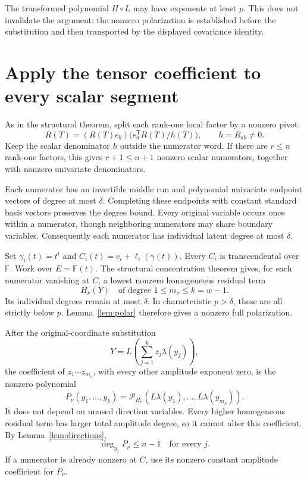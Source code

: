 \documentclass[11pt]{article}
\newcommand{\F}{\mathbb F}
\begin{document}
The transformed polynomial \(H\circ L\) may have exponents at least
\(p\). This does not invalidate the argument: the nonzero polarization
is established before the substitution and then transported by the
displayed covariance identity.

\section{Apply the tensor coefficient to every scalar segment}

As in the structural theorem, split each rank-one local factor
by a nonzero pivot:
\[
 R(T)=(R(T)e_b)\bigl(e_a^{\mathsf T}R(T)/h(T)\bigr),
 \qquad h=R_{ab}\ne0.
\]
Keep the scalar denominator \(h\) outside the numerator word.
If there are \(r\le n\) rank-one factors, this gives \(r+1\le n+1\)
nonzero scalar numerators, together with nonzero univariate
denominators.

Each numerator has an invertible middle run and polynomial
univariate endpoint vectors of degree at most \(\delta\).
Completing these endpoints with constant standard basis vectors
preserves the degree bound.
Every original variable occurs once within a numerator, though
neighboring numerators may share boundary variables.
Consequently each numerator has individual latent degree at most
\(\delta\).

Set \(\gamma_i(t)=t^i\) and
\(C_i(t)=c_i+\ell_i(\gamma(t))\).
Every \(C_i\) is transcendental over \(\F\).
Work over \(E=\F(t)\).
The structural concentration theorem gives, for each numerator
vanishing at \(C\), a lowest nonzero homogeneous residual term
\[
 H_\nu(Y)\quad\text{of degree }1\le m_\nu\le k=w-1.
\]
Its individual degrees remain at most \(\delta\).
In characteristic \(p>\delta\), these are all strictly below \(p\).
Lemma~\ref{lem:polar} therefore gives a nonzero full polarization.

After the original-coordinate substitution
\[
 Y=L\left(\sum_{j=1}^{k}z_j\lambda(y_j)\right),
\]
the coefficient of \(z_1\cdots z_{m_\nu}\), with every other
amplitude exponent zero, is the nonzero polynomial
\[
 P_\nu(y_1,\ldots,y_k)
 =\mathcal P_{H_\nu}
       (L\lambda(y_1),\ldots,L\lambda(y_{m_\nu})).
\]
It does not depend on unused direction variables.
Every higher homogeneous residual term has larger total amplitude
degree, so it cannot alter this coefficient.
By Lemma~\ref{lem:directions},
\[
 \deg_{y_j}P_\nu\le n-1
 \quad\text{for every }j.
\]
If a numerator is already nonzero at \(C\), use its nonzero
constant amplitude coefficient for \(P_\nu\).
\end{document}
